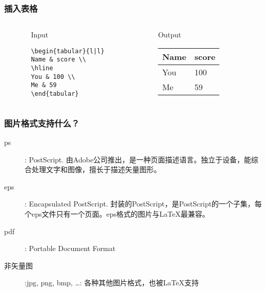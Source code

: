 \begin{frame}[fragile]\frametitle{插入表格}
  \begin{columns}
    \begin{column}{0.05\textwidth}
    \end{column}
    \begin{column}{0.45\textwidth}
    \begin{block}{Input}
    \begin{verbatim}
\begin{tabular}{l|l}
Name & score \\
\hline
You & 100 \\
Me & 59
\end{tabular}
    \end{verbatim}
    \end{block}
    \end{column}
    \begin{column}{0.05\textwidth}
    \end{column}
    \begin{column}{0.40\textwidth}
    \begin{block}{Output}
        \begin{tabular}{l|l}
        Name & score \\
        \hline
        You & 100 \\
        Me & 59
        \end{tabular}
    \end{block}
    \end{column}
    \begin{column}{0.05\textwidth}
    \end{column}
  \end{columns}
\end{frame}

\begin{frame}[fragile]\frametitle{图片格式支持什么？}
    \begin{description}
		\item[ps]: PostScript. 由Adobe公司推出，是一种页面描述语言。独立于设备，能综合处理文字和图像，擅长于描述矢量图形。
		\item[eps]: Encapsulated PostScript. 封装的PostScript，是PostScript的一个子集，每个eps文件只有一个页面。eps格式的图片与\LaTeX 最兼容。
        \item[pdf]: Portable Document Format
		\item[非矢量图]:jpg, png, bmp, \ldots : 各种其他图片格式，也被\LaTeX 支持
	\end{description}
\end{frame}

